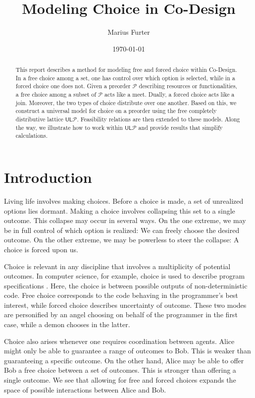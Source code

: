 \documentclass[12pt]{article}
\title{Modeling Choice in Co-Design}
\author{Marius Furter}
\date{\today}
\theoremstyle{definition}
\theoremstyle{plain}
\theoremstyle{plain}
\theoremstyle{plain}
\theoremstyle{plain}
\theoremstyle{remark}
\theoremstyle{remark}
\newcommand{\mc}[1]{\mathcal{#1}}
\newcommand{\low}{\mathsf{L}}
\newcommand{\upper}{\mathsf{U}}
\begin{document}
\maketitle

\begin{abstract}
	This report describes a method for modeling free and forced choice within Co-Design. In a free choice among a set, one has control over which option is selected, while in a forced choice one does not. Given a preorder $\mc{P}$ describing resources or functionalities, a free choice among a subset of $\mc{P}$ acts like a meet. Dually, a forced choice acts like a join. Moreover, the two types of choice distribute over one another. Based on this, we construct a universal model for choice on a preorder using the free completely distributive lattice $\upper\low\mc{P}$. Feasibility relations are then extended to these models. Along the way, we illustrate how to work within $\upper\low\mc{P}$ and provide results that simplify calculations.
\end{abstract}
\newpage
\tableofcontents
\newpage

\section{Introduction}
Living life involves making choices. Before a choice is made, a set of unrealized options lies dormant. Making a choice involves collapsing this set to a single outcome. This collapse may occur in several ways. On the one extreme, we may be in full control of which option is realized: We can freely choose the desired outcome. On the other extreme, we may be powerless to steer the collapse: A choice is forced upon us.

Choice is relevant in any discipline that involves a multiplicity of potential outcomes. In computer science, for example, choice is used to describe program specifications \cite{Martin2007,Morris2004}. Here, the choice is between possible outputs of non-deterministic code. Free choice corresponds to the code behaving in the programmer's best interest, while forced choice describes uncertainty of outcome. These two modes are personified by an angel choosing on behalf of the programmer in the first case, while a demon chooses in the latter.

Choice also arises whenever one requires coordination between agents. Alice might only be able to guarantee a range of outcomes to Bob. This is weaker than guaranteeing a specific outcome. On the other hand, Alice may be able to offer Bob a free choice between a set of outcomes. This is stronger than offering a single outcome. We see that allowing for free and forced choices expands the space of possible interactions between Alice and Bob.
\end{document}

